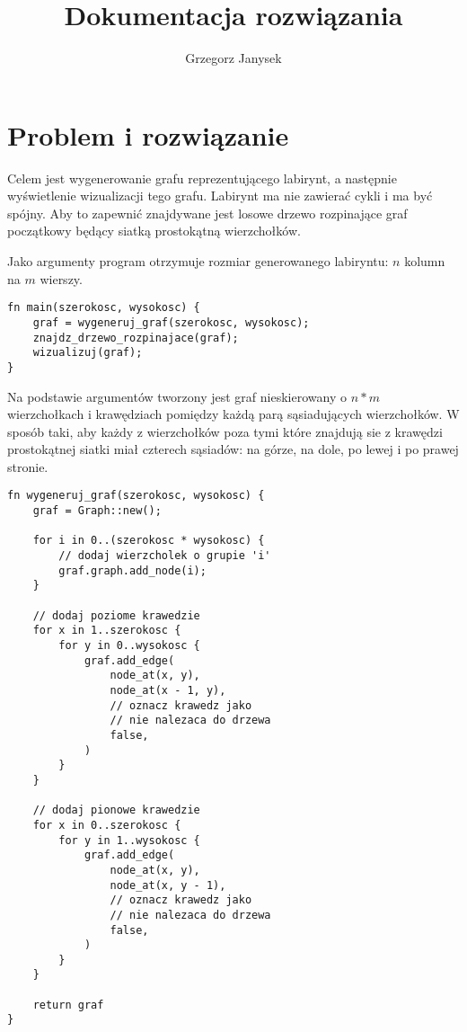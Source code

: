 \documentclass[twocolumn]{article}
\author{Grzegorz Janysek}
\title{Dokumentacja rozwiązania}
\begin{document}
\maketitle

\section{Problem i rozwiązanie}
Celem jest wygenerowanie grafu reprezentującego labirynt, a następnie wyświetlenie wizualizacji tego grafu.
Labirynt ma nie zawierać cykli i ma być spójny.
Aby to zapewnić znajdywane jest losowe drzewo rozpinające graf początkowy będący siatką prostokątną wierzchołków.

Jako argumenty program otrzymuje rozmiar generowanego labiryntu: \(n\) kolumn na \(m\) wierszy.
\begin{lstlisting}
fn main(szerokosc, wysokosc) {
	graf = wygeneruj_graf(szerokosc, wysokosc);
	znajdz_drzewo_rozpinajace(graf);
	wizualizuj(graf);
}
\end{lstlisting}

Na podstawie argumentów tworzony jest graf nieskierowany o \(n*m\) wierzchołkach i krawędziach pomiędzy każdą parą sąsiadujących wierzchołków.
W sposób taki, aby każdy z wierzchołków poza tymi które znajdują sie z krawędzi prostokątnej siatki miał czterech sąsiadów: na górze, na dole, po lewej i po prawej stronie.
\begin{lstlisting}
fn wygeneruj_graf(szerokosc, wysokosc) {
	graf = Graph::new();

	for i in 0..(szerokosc * wysokosc) {
		// dodaj wierzcholek o grupie 'i'
		graf.graph.add_node(i);
	}

	// dodaj poziome krawedzie
	for x in 1..szerokosc {
		for y in 0..wysokosc {
			graf.add_edge(
				node_at(x, y),
				node_at(x - 1, y),
				// oznacz krawedz jako
				// nie nalezaca do drzewa
				false,
			)
		}
	}

	// dodaj pionowe krawedzie
	for x in 0..szerokosc {
		for y in 1..wysokosc {
			graf.add_edge(
				node_at(x, y),
				node_at(x, y - 1),
				// oznacz krawedz jako
				// nie nalezaca do drzewa
				false,
			)
		}
	}

	return graf
}
\end{lstlisting}
\end{document}
